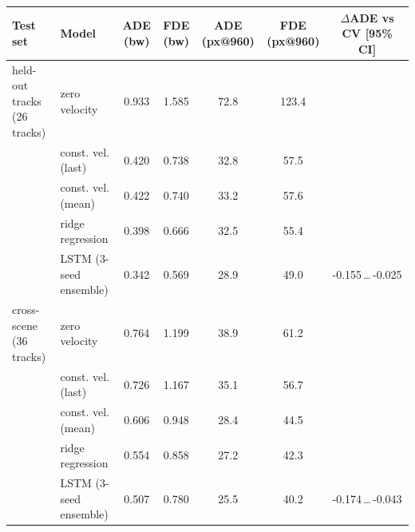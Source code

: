\begin{tabular}{@{}llccccc@{}}
\toprule
Test set & Model & ADE (bw) & FDE (bw) & ADE (px@960) & FDE (px@960) & $\Delta$ADE vs CV [95\% CI] \\
\midrule
held-out tracks (26 tracks) & zero velocity & 0.933 & 1.585 & 72.8 & 123.4 &  \\
 & const. vel. (last) & 0.420 & 0.738 & 32.8 & 57.5 &  \\
 & const. vel. (mean) & 0.422 & 0.740 & 33.2 & 57.6 &  \\
 & ridge regression & 0.398 & 0.666 & 32.5 & 55.4 &  \\
 & LSTM (3-seed ensemble) & 0.342 & 0.569 & 28.9 & 49.0 & -0.155\,\ldots\,-0.025 \\
\midrule
cross-scene (36 tracks) & zero velocity & 0.764 & 1.199 & 38.9 & 61.2 &  \\
 & const. vel. (last) & 0.726 & 1.167 & 35.1 & 56.7 &  \\
 & const. vel. (mean) & 0.606 & 0.948 & 28.4 & 44.5 &  \\
 & ridge regression & 0.554 & 0.858 & 27.2 & 42.3 &  \\
 & LSTM (3-seed ensemble) & 0.507 & 0.780 & 25.5 & 40.2 & -0.174\,\ldots\,-0.043 \\
\bottomrule
\end{tabular}
